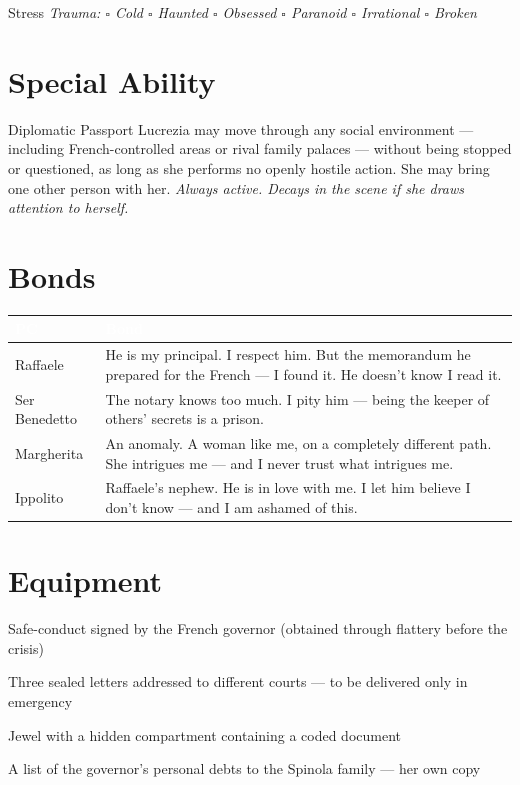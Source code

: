 \medskip
\begin{pgclockbox}{Stress \hfill {}}
\small\textit{Trauma: $\square$ Cold \quad $\square$ Haunted \quad $\square$ Obsessed \quad $\square$ Paranoid \quad $\square$ Irrational \quad $\square$ Broken}
\end{pgclockbox}

\section*{Special Ability}
\begin{spinolabox}{Diplomatic Passport}
Lucrezia may move through any social environment --- including French-controlled areas
or rival family palaces --- without being stopped or questioned, as long as she
performs no openly hostile action. She may bring one other person with her.
\textit{Always active. Decays in the scene if she draws attention to herself.}
\end{spinolabox}

\section*{Bonds}
\begin{table}[h]\centering\renewcommand{\arraystretch}{1.4}
\begin{tabularx}{\linewidth}{@{}L{2.6cm} X@{}}
\toprule{}
\textcolor{white}{\textbf{PC}} & \textcolor{white}{\textbf{Bond}} \\
\midrule
Raffaele & He is my principal. I respect him. But the memorandum he prepared for the French --- I found it. He doesn't know I read it. \\
Ser Benedetto & The notary knows too much. I pity him --- being the keeper of others' secrets is a prison. \\
Margherita & An anomaly. A woman like me, on a completely different path. She intrigues me --- and I never trust what intrigues me. \\
Ippolito & Raffaele's nephew. He is in love with me. I let him believe I don't know --- and I am ashamed of this. \\
\bottomrule
\end{tabularx}
\end{table}

\section*{Equipment}
\begin{goldlist}
\item Safe-conduct signed by the French governor (obtained through flattery before the crisis)
\item Three sealed letters addressed to different courts --- to be delivered only in emergency
\item Jewel with a hidden compartment containing a coded document
\item A list of the governor's personal debts to the Spinola family --- her own copy
\end{goldlist}

